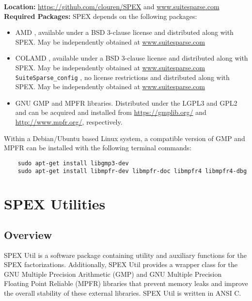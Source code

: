 \documentclass[12pt]{report}
\theoremstyle{definition}
\begin{document}
\noindent \textbf{Location:} \url{https://github.com/clouren/SPEX} and
\url{www.suitesparse.com}\\

\noindent \textbf{Required Packages:} SPEX depends on the following packages:
    \begin{itemize} 
    \item AMD \cite{amestoy1996approximate,amestoy2004algorithmamd}, available under a BSD
3-clause license and distributed along with SPEX. May be independently obtained at \url{www.suitesparse.com}
    \item COLAMD \cite{davis2004column,davis2004algorithmcolamd}, available under a BSD
3-clause license and distributed along with SPEX. May be independently obtained at \url{www.suitesparse.com}
    \verb|SuiteSparse_config| \cite{davis2020suitesparse}, no license restrictions and distributed along with SPEX. May be independently obtained at \url{www.suitesparse.com}
    \item GNU GMP \cite{granlund2015gnu} and MPFR
\cite{fousse2007mpfr} libraries. Distributed under the LGPL3 and GPL2 and can be acquired and installed
from \url{https://gmplib.org/} and \url{http://www.mpfr.org/}, respectively.
    \end{itemize}

Within a Debian/Ubuntu based Linux system, a compatible version of GMP and MPFR can be installed with the following terminal commands:

{\small
\begin{verbatim}
    sudo apt-get install libgmp3-dev
    sudo apt-get install libmpfr-dev libmpfr-doc libmpfr4 libmpfr4-dbg
\end{verbatim} }


\chapter{SPEX Utilities} \label{ch:Util}

\section{Overview} \label{s:util:overview}

SPEX Util is a software package containing utility and auxiliary functions for the SPEX 
factorizations. Additionally, SPEX Util provides a wrapper class for
the GNU Multiple Precision Arithmetic (GMP) \cite{granlund2015gnu} and GNU
Multiple Precision Floating Point Reliable (MPFR) \cite{fousse2007mpfr}
libraries that prevent memory leaks and improve the overall stability of
these external libraries. SPEX Util is written in ANSI C.
\end{document}
